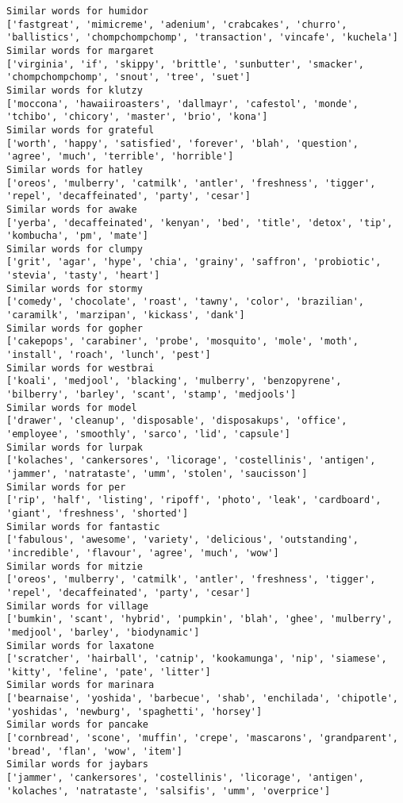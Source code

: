 \documentclass[11pt]{article}
\begin{document}
\begin{Verbatim}[commandchars=\\\{\}]
Similar words for humidor
['fastgreat', 'mimicreme', 'adenium', 'crabcakes', 'churro', 'ballistics', 'chompchompchomp', 'transaction', 'vincafe', 'kuchela']
Similar words for margaret
['virginia', 'if', 'skippy', 'brittle', 'sunbutter', 'smacker', 'chompchompchomp', 'snout', 'tree', 'suet']
Similar words for klutzy
['moccona', 'hawaiiroasters', 'dallmayr', 'cafestol', 'monde', 'tchibo', 'chicory', 'master', 'brio', 'kona']
Similar words for grateful
['worth', 'happy', 'satisfied', 'forever', 'blah', 'question', 'agree', 'much', 'terrible', 'horrible']
Similar words for hatley
['oreos', 'mulberry', 'catmilk', 'antler', 'freshness', 'tigger', 'repel', 'decaffeinated', 'party', 'cesar']
Similar words for awake
['yerba', 'decaffeinated', 'kenyan', 'bed', 'title', 'detox', 'tip', 'kombucha', 'pm', 'mate']
Similar words for clumpy
['grit', 'agar', 'hype', 'chia', 'grainy', 'saffron', 'probiotic', 'stevia', 'tasty', 'heart']
Similar words for stormy
['comedy', 'chocolate', 'roast', 'tawny', 'color', 'brazilian', 'caramilk', 'marzipan', 'kickass', 'dank']
Similar words for gopher
['cakepops', 'carabiner', 'probe', 'mosquito', 'mole', 'moth', 'install', 'roach', 'lunch', 'pest']
Similar words for westbrai
['koali', 'medjool', 'blacking', 'mulberry', 'benzopyrene', 'bilberry', 'barley', 'scant', 'stamp', 'medjools']
Similar words for model
['drawer', 'cleanup', 'disposable', 'disposakups', 'office', 'employee', 'smoothly', 'sarco', 'lid', 'capsule']
Similar words for lurpak
['kolaches', 'cankersores', 'licorage', 'costellinis', 'antigen', 'jammer', 'natrataste', 'umm', 'stolen', 'saucisson']
Similar words for per
['rip', 'half', 'listing', 'ripoff', 'photo', 'leak', 'cardboard', 'giant', 'freshness', 'shorted']
Similar words for fantastic
['fabulous', 'awesome', 'variety', 'delicious', 'outstanding', 'incredible', 'flavour', 'agree', 'much', 'wow']
Similar words for mitzie
['oreos', 'mulberry', 'catmilk', 'antler', 'freshness', 'tigger', 'repel', 'decaffeinated', 'party', 'cesar']
Similar words for village
['bumkin', 'scant', 'hybrid', 'pumpkin', 'blah', 'ghee', 'mulberry', 'medjool', 'barley', 'biodynamic']
Similar words for laxatone
['scratcher', 'hairball', 'catnip', 'kookamunga', 'nip', 'siamese', 'kitty', 'feline', 'pate', 'litter']
Similar words for marinara
['bearnaise', 'yoshida', 'barbecue', 'shab', 'enchilada', 'chipotle', 'yoshidas', 'newburg', 'spaghetti', 'horsey']
Similar words for pancake
['cornbread', 'scone', 'muffin', 'crepe', 'mascarons', 'grandparent', 'bread', 'flan', 'wow', 'item']
Similar words for jaybars
['jammer', 'cankersores', 'costellinis', 'licorage', 'antigen', 'kolaches', 'natrataste', 'salsifis', 'umm', 'overprice']

\end{Verbatim}
\end{document}
